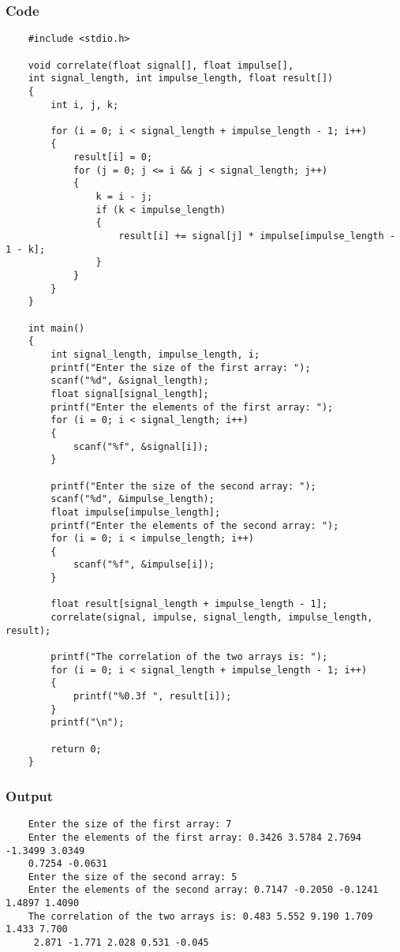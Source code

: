 \documentclass{article}
\begin{document}
\subsubsection{Code}
\begin{lstlisting}
    #include <stdio.h>

    void correlate(float signal[], float impulse[], 
    int signal_length, int impulse_length, float result[])
    {
        int i, j, k;

        for (i = 0; i < signal_length + impulse_length - 1; i++)
        {
            result[i] = 0;
            for (j = 0; j <= i && j < signal_length; j++)
            {
                k = i - j;
                if (k < impulse_length)
                {
                    result[i] += signal[j] * impulse[impulse_length - 1 - k];
                }
            }
        }
    }

    int main()
    {
        int signal_length, impulse_length, i;
        printf("Enter the size of the first array: ");
        scanf("%d", &signal_length);
        float signal[signal_length];
        printf("Enter the elements of the first array: ");
        for (i = 0; i < signal_length; i++)
        {
            scanf("%f", &signal[i]);
        }

        printf("Enter the size of the second array: ");
        scanf("%d", &impulse_length);
        float impulse[impulse_length];
        printf("Enter the elements of the second array: ");
        for (i = 0; i < impulse_length; i++)
        {
            scanf("%f", &impulse[i]);
        }

        float result[signal_length + impulse_length - 1];
        correlate(signal, impulse, signal_length, impulse_length, result);

        printf("The correlation of the two arrays is: ");
        for (i = 0; i < signal_length + impulse_length - 1; i++)
        {
            printf("%0.3f ", result[i]);
        }
        printf("\n");

        return 0;
    }

\end{lstlisting}

\subsubsection{Output}
\begin{lstlisting}
    Enter the size of the first array: 7
    Enter the elements of the first array: 0.3426 3.5784 2.7694 -1.3499 3.0349 
    0.7254 -0.0631
    Enter the size of the second array: 5
    Enter the elements of the second array: 0.7147 -0.2050 -0.1241 1.4897 1.4090
    The correlation of the two arrays is: 0.483 5.552 9.190 1.709 1.433 7.700
     2.871 -1.771 2.028 0.531 -0.045 
\end{lstlisting}
\end{document}
